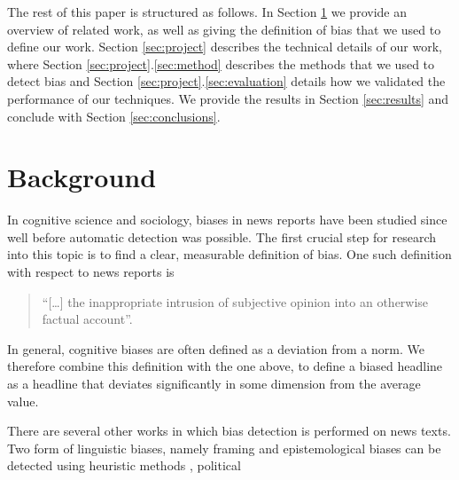 \documentclass[final]{ieee}
\begin{document}
The rest of this paper is structured as follows. In Section \ref{sec:background} we provide an overview of related work, as well as giving the definition of bias that we used to define our work. Section \ref{sec:project} describes the technical details of our work, where Section \ref{sec:project}.\ref{sec:method} describes the methods that we used to detect bias and Section \ref{sec:project}.\ref{sec:evaluation} details how we validated the performance of our techniques. We provide the results in Section \ref{sec:results} and conclude with Section \ref{sec:conclusions}. 

     

            
            
\section{Background}\label{sec:background}

In cognitive science and sociology, biases in news reports have been studied since well before automatic detection was possible. The first crucial step for research into this topic is to find a clear, measurable definition of bias. One such definition with respect to news reports is \begin{quotation}
``[\dots] the inappropriate intrusion of subjective opinion into an otherwise factual account''.\cite{STOCKING89}
\end{quotation}
In general, cognitive biases are often defined as a deviation from a norm. We therefore combine this definition with the one above, to define a biased headline as a headline that deviates significantly in some dimension from the average value.
  
There are several other works in which bias detection is performed on news texts. Two form of linguistic biases, namely framing and epistemological biases can be detected using heuristic methods \cite{RECASENS13}, political 


%            
%
\end{document}
